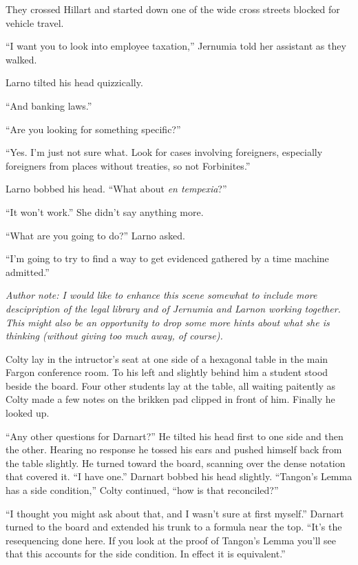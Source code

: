 They crossed Hillart and started down one of the wide cross streets blocked for vehicle travel.

``I want you to look into employee taxation,'' Jernumia told her assistant as they walked.

Larno tilted his head quizzically.

``And banking laws.''

``Are you looking for something specific?''

``Yes. I'm just not sure what. Look for cases involving foreigners, especially foreigners from
places without treaties, so not Forbinites.''

Larno bobbed his head. ``What about \textit{en tempexia}?''

``It won't work.'' She didn't say anything more.

``What are you going to do?'' Larno asked.

``I'm going to try to find a way to get evidenced gathered by a time machine admitted.''

\textit{Author note: I would like to enhance this scene somewhat to include more descipription
  of the legal library and of Jernumia and Larnon working together. This might also be an
  opportunity to drop some more hints about what she is thinking (without giving too much away,
  of course).}

\spacebreak

Colty lay in the intructor's seat at one side of a hexagonal table in the main Fargon conference
room. To his left and slightly behind him a student stood beside the board. Four other students
lay at the table, all waiting paitently as Colty made a few notes on the brikken pad clipped in
front of him. Finally he looked up.

``Any other questions for Darnart?'' He tilted his head first to one side and then the other.
Hearing no response he tossed his ears and pushed himself back from the table slightly. He
turned toward the board, scanning over the dense notation that covered it. ``I have one.''
Darnart bobbed his head slightly. ``Tangon's Lemma has a side condition,'' Colty continued,
``how is that reconciled?''

``I thought you might ask about that, and I wasn't sure at first myself.'' Darnart turned to the
board and extended his trunk to a formula near the top. ``It's the resequencing done here. If
you look at the proof of Tangon's Lemma you'll see that this accounts for the side condition. In
effect it is equivalent.''

